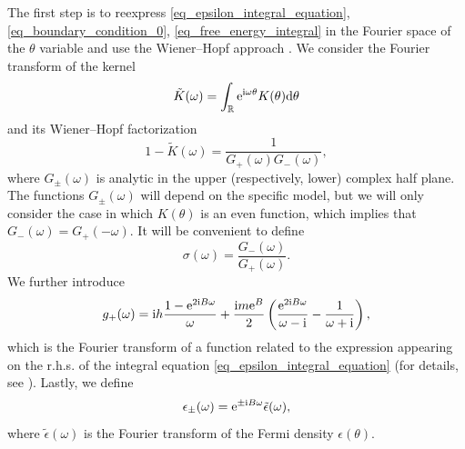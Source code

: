 \documentclass[a4paper,11pt]{article}
\theoremstyle{definition}
\newcommand{\re}{{\rm e}}
\newcommand{\ri}{{\rm i}}
\newcommand{\rd}{{\rm d}}
\begin{document}
The first step is to reexpress \eqref{eq_epsilon_integral_equation}, 
\eqref{eq_boundary_condition_0}, \eqref{eq_free_energy_integral} in the Fourier space of the 
$\theta$ variable and use the Wiener--Hopf approach \cite{jap-w,hmn,fnw1}. 
We consider the Fourier transform of the kernel
%
\begin{equation}
\tilde{K}(\omega) = \int_\mathbb{R} \re^{\ri \omega \theta} K(\theta) \rd\theta
\end{equation}
%
and its Wiener--Hopf factorization
%
\begin{equation}
1-\tilde{K}(\omega) = \frac{1}{G_+(\omega) G_-(\omega)},
\end{equation}
%
where $G_\pm(\omega)$ is analytic in the upper (respectively, lower) 
complex half plane. The functions $G_\pm(\omega)$ will depend on the 
specific model, but we will only
consider the case in which $K(\theta)$ is an even function, which implies that $G_-(\omega) = G_+(-\omega)$. It will be convenient to define
%
\begin{equation}
\sigma(\omega) = \frac{G_-(\omega)}{G_+(\omega)}.
\label{eq_sigma_def}
\end{equation}
%
We further introduce
%
\begin{equation}
g_+(\omega) = \ri h \frac{1-\re^{2\ri B\omega}}{\omega} +
 \frac{\ri m\re^B}{2}\left( \frac{\re^{2\ri B\omega}}{\omega-\ri} - \frac{1}{\omega+\ri}  \right),
\label{eq_g}
\end{equation}
%
which is the Fourier transform of a function related to the 
expression appearing on the r.h.s. of the integral equation 
\eqref{eq_epsilon_integral_equation} (for details, see 
\cite{mmr-an}). Lastly, we define
%
\begin{equation}
\epsilon_\pm(\omega) = \re^{\pm\ri B \omega} \tilde{\epsilon}(\omega),
\end{equation}
%
where $\tilde{\epsilon}(\omega)$ is the Fourier 
transform of the Fermi density $\epsilon(\theta)$.
\end{document}
